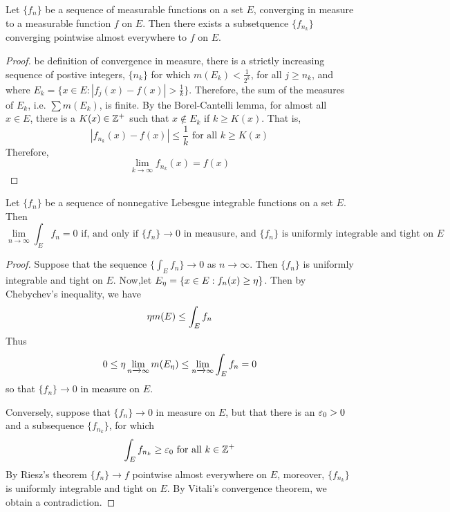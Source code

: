 \begin{theorem}\label{10.6.2}
    Let $\{f_n\}$ be a sequence of measurable functions on a set $E$, converging
    in measure to a measurable function  $f$ on  $E$. Then there exists a
    subsetquence  $\{f_{n_k}\}$ converging pointwise almost everywhere to $f$ on
     $E$.
\end{theorem}
\begin{proof}
    be definition of convergence in measure, there is a strictly increasing
    sequence of postive integers, $\{n_k\}$ for which $m(E_k)<\frac{1}{2^k}$,
    for all $j \geq n_k$, and where  $E_k=\{x \in E :
    |f_j(x)-f(x)|>\frac{1}{k}\}$. Therefore, the sum of the measures of
    $E_k$, i.e.  $\sum{m(E_k)}$, is finite. By the Borel-Cantelli lemma, for
    almost all $x \in E$, there is a  $K(x) \in \mathbb{Z}^+$ such that $x \notin E_k$
    if  $k \geq K(x)$. That is,
    \begin{equation*}
        |f_{n_k}(x)-f(x)| \leq \frac{1}{k} \text{ for all } k \geq K(x)
    \end{equation*}
    Therefore,
    \begin{equation*}
        \lim_{k \xrightarrow{} \infty}{f_{n_k}(x)}=f(x)
    \end{equation*}
\end{proof}
\begin{corollary}
    Let $\{f_n\}$ be a sequence of nonnegative Lebesgue integrable functions on
    a set $E$. Then
    \begin{equation*}
        \lim_{n \xrightarrow{} \infty}{\int_E{f_n}}=0 \text{ if, and only if }
        \{f_n\} \xrightarrow{} 0 \text{ in meausure, and } \{f_n\} \text{ is
        uniformly integrable and tight on } E
    \end{equation*}
\end{corollary}
\begin{proof}
    Suppose that the sequence $\{\int_E{f_n}\} \xrightarrow{} 0$ as $n
    \xrightarrow{} \infty$. Then $\{f_n\}$ is uniformly integrable and tight on
    $E$. Now,let  $E_\eta =\{x \in E : f_n(x) \geq \eta\}$. Then by Chebychev's
    inequality, we have
    \begin{equation*}
        \eta{m(E)} \leq \int_E{f_n}
    \end{equation*}
    Thus
    \begin{equation*}
        0 \leq
        \eta\lim_{n \xrightarrow{} \infty}{m(E_\eta)} \leq
        \lim_{n \xrightarrow{} \infty}{\int_E{f_n}}=0
    \end{equation*}
    so that $\{f_n\} \xrightarrow{} 0$ in measure on $E$.

    Conversely, suppose that  $\{f_n\} \xrightarrow{} 0$ in measure on $E$, but
    that there is an  $\varepsilon_0>0$ and a subsequence $\{f_{n_k}\}$, for which
    \begin{equation*}
        \int_E{f_{n_k}} \geq \varepsilon_0 \text{ for all } k \in \mathbb{Z}^+
    \end{equation*}
    By Riesz's theorem $\{f_n\} \xrightarrow{} f$ pointwise almost everywhere on
    $E$, moreover,  $\{f_{n_k}\}$ is uniformly integrable and tight on $E$. By
    Vitali's convergence theorem, we obtain a contradiction.
\end{proof}
